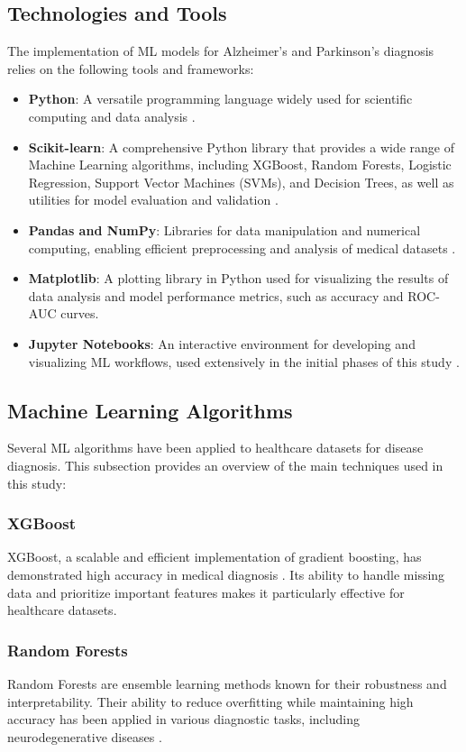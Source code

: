 \documentclass[conference]{IEEEtran}
\begin{document}
\subsection{Technologies and Tools}
The implementation of ML models for Alzheimer’s and Parkinson’s diagnosis relies on the following tools and frameworks:
\begin{itemize}
    \item \textbf{Python}: A versatile programming language widely used for scientific computing and data analysis \cite{b3}.
    \item \textbf{Scikit-learn}: A comprehensive Python library that provides a wide range of Machine Learning algorithms, including XGBoost, Random Forests, Logistic Regression, Support Vector Machines (SVMs), and Decision Trees, as well as utilities for model evaluation and validation \cite{b1, b2}.
    \item \textbf{Pandas and NumPy}: Libraries for data manipulation and numerical computing, enabling efficient preprocessing and analysis of medical datasets \cite{b1}.
    \item \textbf{Matplotlib}: A plotting library in Python used for visualizing the results of data analysis and model performance metrics, such as accuracy and ROC-AUC curves.
    \item \textbf{Jupyter Notebooks}: An interactive environment for developing and visualizing ML workflows, used extensively in the initial phases of this study \cite{b2}.
\end{itemize}

\subsection{Machine Learning Algorithms}
Several ML algorithms have been applied to healthcare datasets for disease diagnosis. This subsection provides an overview of the main techniques used in this study:
\subsubsection{XGBoost}
XGBoost, a scalable and efficient implementation of gradient boosting, has demonstrated high accuracy in medical diagnosis \cite{b1}. Its ability to handle missing data and prioritize important features makes it particularly effective for healthcare datasets.

\subsubsection{Random Forests}
Random Forests are ensemble learning methods known for their robustness and interpretability. Their ability to reduce overfitting while maintaining high accuracy has been applied in various diagnostic tasks, including neurodegenerative diseases \cite{b2}.
\end{document}
